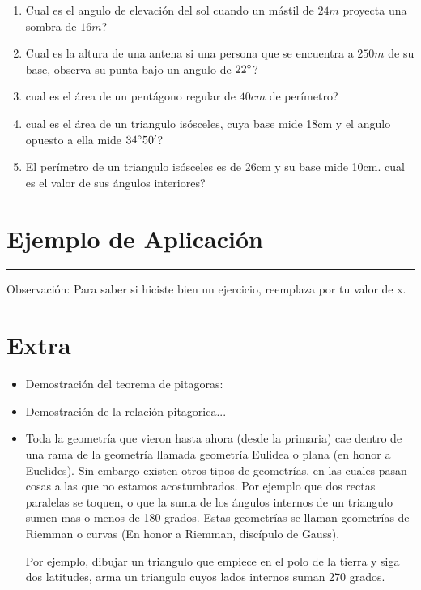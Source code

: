 \documentclass[a4paper,11pt,spanish,sans]{exam}
\begin{document}
\begin{enumerate}

\item Cual es el angulo de elevación del sol cuando un mástil de $24m$ proyecta una sombra de $16m$?
\item Cual es la altura de una antena si una persona que se encuentra a $250m$ de su base, observa su punta bajo un angulo de $22\degree$?
\item cual es el área de un pentágono regular de $40cm$ de perímetro?
\item cual es el área de un triangulo isósceles, cuya base mide 18cm y el angulo opuesto a ella mide $34\degree 50'$?
\item El perímetro de un triangulo isósceles es de 26cm y su base mide 10cm. cual es el valor de sus ángulos interiores?

\end{enumerate} 


\section{Ejemplo de Aplicación}

\rule[2ex]{\textwidth}{2pt}

Observación: Para saber si hiciste bien un ejercicio, reemplaza por tu valor de x.

\section*{Extra}

\begin{itemize}
\item Demostración del teorema de pitagoras:

\item Demostración de la relación pitagorica...%

\item Toda la geometría que vieron hasta ahora (desde la primaria) cae dentro de una rama de la geometría llamada geometría Eulidea o plana (en honor a Euclides).
Sin embargo existen otros tipos de geometrías, en las cuales pasan cosas a las que no estamos acostumbrados.
Por ejemplo que dos rectas paralelas se toquen, o que la suma  de los ángulos internos de un triangulo sumen mas o menos de 180 grados.
Estas geometrías se llaman geometrías de Riemman o curvas (En honor a Riemman, discípulo de Gauss).

Por ejemplo, dibujar un triangulo que empiece en el polo de la tierra y siga dos latitudes, arma un triangulo cuyos lados internos suman 270 grados.


\end{itemize}
\end{document}
